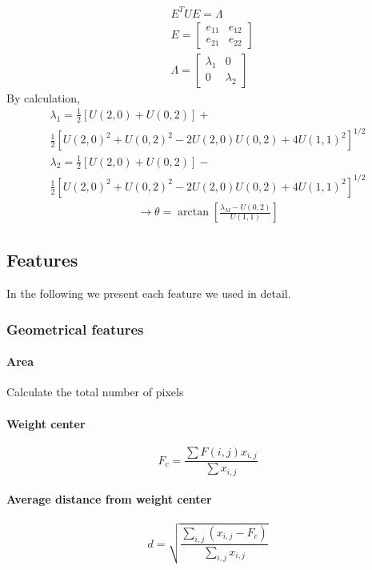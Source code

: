 \documentclass{article}
\begin{document}
\begin{align}
&E^T U E = \Lambda\\
&E=\begin{bmatrix}
 e_{11}&e_{12} \\ 
 e_{21}&e_{22} 
\end{bmatrix}
\\
&\Lambda=\begin{bmatrix}
 \lambda_1&0 \\ 
0 & \lambda_2
\end{bmatrix}
\end{align}
By calculation, 
\begin{multline}
\lambda_1=\frac{1}{2}\left[U(2,0)+U(0,2)\right] + \\ \frac{1}{2}\left[U(2,0)^2+U(0,2)^2-2U(2,0)U(0,2)+4U(1,1)^2\right]^{1/2}
\end{multline}
\begin{multline}
\lambda_2=\frac{1}{2}\left[U(2,0)+U(0,2)\right] - \\ \frac{1}{2}\left[U(2,0)^2+U(0,2)^2-2U(2,0)U(0,2)+4U(1,1)^2\right]^{1/2} 
\end{multline}
\begin{multline}
\rightarrow \theta=\arctan{\left[ \frac{\lambda_M - U(0,2)}{U(1,1)} \right] }
\end{multline}

\subsection{Features}
In the following we present each feature we used in detail.

\subsubsection{Geometrical features}

\paragraph{Area}
Calculate the total number of pixels

\paragraph{Weight center}
\begin{equation}
F_c=\frac{\sum F(i,j)x_{i,j}}{\sum x_{i,j}}
\end{equation}

\paragraph{Average distance from weight center}
\begin{equation}
d = \sqrt{\frac{\sum_{i,j}(x_{i,j} - F_c)}{\sum_{i,j}x_{i,j}}}
\end{equation}
\end{document}
